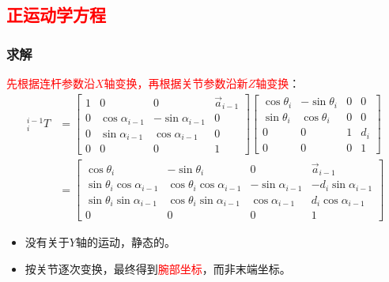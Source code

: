 \documentclass[
12pt, %
a4paper, 
oneside, %
]{scrartcl}
\begin{document}
\subsection[正运动学方程]{\textcolor{red}{正运动学方程}}
\subsubsection[求解]{求解}
\textcolor{red}{先根据连杆参数沿$ X $轴变换，再根据关节参数沿新$ Z $轴变换}：
\begin{align*}
{}^{i - 1}_i T &= \begin{bmatrix} 1 & 0 & 0 & \vec{a}_{i - 1} \\ 0 & \cos\alpha_{i - 1} & -\sin\alpha_{i - 1} & 0 \\ 0 & \sin\alpha_{i - 1} & \cos\alpha_{i - 1} & 0 \\ 0 & 0 & 0 & 1 \end{bmatrix} \begin{bmatrix} \cos\theta_i & -\sin\theta_i & 0 & 0 \\ \sin\theta_i & \cos\theta_i & 0 & 0 \\ 0 & 0 & 1 & d_i \\ 0 & 0 & 0 & 1 \end{bmatrix} \\
&= \begin{bmatrix} \cos\theta_i & -\sin\theta_i & 0 & \vec{a}_{i - 1} \\ \sin\theta_i \cos\alpha_{i - 1} & \cos\theta_i \cos\alpha_{i - 1} & -\sin\alpha_{i - 1} & -d_i \sin\alpha_{i - 1} \\ \sin\theta_i \sin\alpha_{i - 1} & \cos\theta_i \sin\alpha_{i - 1} & \cos\alpha_{i - 1} & d_i \cos\alpha_{i - 1} \\ 0 & 0 & 0 & 1 \end{bmatrix}
\end{align*}

\begin{itemize}
\item 没有关于$ Y $轴的运动，静态的。
\item 按关节逐次变换，最终得到\textcolor{red}{腕部坐标}，而非末端坐标。
\end{itemize} 
\end{document}
